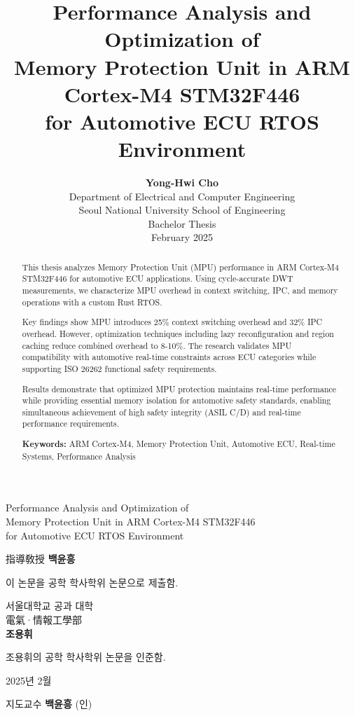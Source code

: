 \documentclass[12pt,a4paper,oneside]{report}
\title{
    \textbf{Performance Analysis and Optimization of\\
    Memory Protection Unit in ARM Cortex-M4 STM32F446\\
    for Automotive ECU RTOS Environment}
}
\author{
    \textbf{Yong-Hwi Cho}\\
    \vspace{0.5cm}
    Department of Electrical and Computer Engineering\\
    Seoul National University School of Engineering\\
    \vspace{0.5cm}
    Bachelor Thesis\\
    February 2025
}
\date{}
\begin{document}
\maketitle
\thispagestyle{empty}

\newpage
\thispagestyle{empty}
\vspace*{2cm}
\begin{center}
\large
Performance Analysis and Optimization of\\
Memory Protection Unit in ARM Cortex-M4 STM32F446\\
for Automotive ECU RTOS Environment

\vspace{1.5cm}
\normalsize
指導敎授 \textbf{백윤흥}

\vspace{1cm}
이 논문을 공학 학사학위 논문으로 제출함.

\vspace{1.5cm}
서울대학교 공과 대학\\
電氣·情報工學部\\
\textbf{조용휘}

\vspace{1.5cm}
조용휘의 공학 학사학위 논문을 인준함.

\vspace{1cm}
2025년 2월

\vspace{1.5cm}
지도교수 \hspace{1cm} \textbf{백윤흥} \hspace{1cm} (인)
\end{center}

\newpage
\begin{abstract}
This thesis analyzes Memory Protection Unit (MPU) performance in ARM Cortex-M4 STM32F446 for automotive ECU applications. Using cycle-accurate DWT measurements, we characterize MPU overhead in context switching, IPC, and memory operations with a custom Rust RTOS.

Key findings show MPU introduces 25\% context switching overhead and 32\% IPC overhead. However, optimization techniques including lazy reconfiguration and region caching reduce combined overhead to 8-10\%. The research validates MPU compatibility with automotive real-time constraints across ECU categories while supporting ISO 26262 functional safety requirements.

Results demonstrate that optimized MPU protection maintains real-time performance while providing essential memory isolation for automotive safety standards, enabling simultaneous achievement of high safety integrity (ASIL C/D) and real-time performance requirements.

\textbf{Keywords:} ARM Cortex-M4, Memory Protection Unit, Automotive ECU, Real-time Systems, Performance Analysis
\end{abstract}

\newpage
\tableofcontents

\newpage
\setcounter{page}{1}






\newpage

\end{document}
